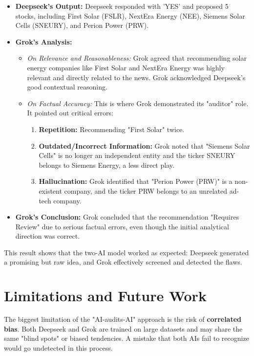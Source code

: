 \documentclass{article}
\begin{document}
\begin{itemize}
    \item \textbf{Deepseek's Output:} Deepseek responded with 'YES' and proposed 5 stocks, including First Solar (FSLR), NextEra Energy (NEE), Siemens Solar Cells (SNEURY), and Perion Power (PRW).
    
    \item \textbf{Grok's Analysis:}
    \begin{itemize}
        \item \textit{On Relevance and Reasonableness:} Grok agreed that recommending solar energy companies like First Solar and NextEra Energy was highly relevant and directly related to the news. Grok acknowledged Deepseek's good contextual reasoning.
        \item \textit{On Factual Accuracy:} This is where Grok demonstrated its "auditor" role. It pointed out critical errors:
            \begin{enumerate}
                \item \textbf{Repetition:} Recommending "First Solar" twice.
                \item \textbf{Outdated/Incorrect Information:} Grok noted that "Siemens Solar Cells" is no longer an independent entity and the ticker SNEURY belongs to Siemens Energy, a less direct play.
                \item \textbf{Hallucination:} Grok identified that "Perion Power (PRW)" is a non-existent company, and the ticker PRW belongs to an unrelated ad-tech company.
            \end{enumerate}
    \end{itemize}
    \item \textbf{Grok's Conclusion:} Grok concluded that the recommendation "Requires Review" due to serious factual errors, even though the initial analytical direction was correct.
\end{itemize}

This result shows that the two-AI model worked as expected: Deepseek generated a promising but raw idea, and Grok effectively screened and detected the flaws.

\section{Limitations and Future Work}

The biggest limitation of the "AI-audits-AI" approach is the risk of \textbf{correlated bias}. Both Deepseek and Grok are trained on large datasets and may share the same "blind spots" or biased tendencies. A mistake that both AIs fail to recognize would go undetected in this process.
\end{document}
